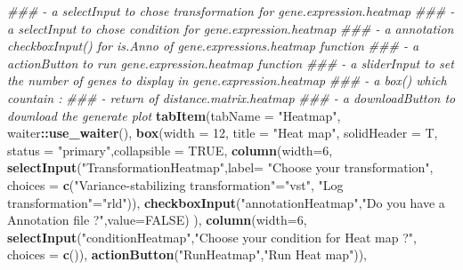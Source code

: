 \documentclass[
  12pt,
]{article}
\newenvironment{Shaded}{\begin{snugshade}}{\end{snugshade}}
\newcommand{\CommentTok}[1]{\textcolor[rgb]{0.56,0.35,0.01}{\textit{#1}}}
\newcommand{\DataTypeTok}[1]{\textcolor[rgb]{0.13,0.29,0.53}{#1}}
\newcommand{\DecValTok}[1]{\textcolor[rgb]{0.00,0.00,0.81}{#1}}
\newcommand{\KeywordTok}[1]{\textcolor[rgb]{0.13,0.29,0.53}{\textbf{#1}}}
\newcommand{\NormalTok}[1]{#1}
\newcommand{\OperatorTok}[1]{\textcolor[rgb]{0.81,0.36,0.00}{\textbf{#1}}}
\newcommand{\OtherTok}[1]{\textcolor[rgb]{0.56,0.35,0.01}{#1}}
\newcommand{\StringTok}[1]{\textcolor[rgb]{0.31,0.60,0.02}{#1}}
\begin{document}
\begin{Shaded}
\begin{Highlighting}[]
            \CommentTok{###         - a selectInput to chose transformation for gene.expression.heatmap  }
            \CommentTok{###         - a selectInput to chose condition for gene.expression.heatmap}
            \CommentTok{###         - a annotation checkboxInput() for is.Anno of gene.expressions.heatmap function}
            \CommentTok{###         - a actionButton to run gene.expression.heatmap function}
            \CommentTok{###         - a sliderInput to set the number of genes to display in gene.expression.heatmap}
            \CommentTok{###     - a box() which countain :}
            \CommentTok{###         - return of distance.matrix.heatmap}
            \CommentTok{###     - a downloadButton to download  the generate plot}
            \KeywordTok{tabItem}\NormalTok{(}\DataTypeTok{tabName =} \StringTok{"Heatmap"}\NormalTok{,}
\NormalTok{                    waiter}\OperatorTok{::}\KeywordTok{use_waiter}\NormalTok{(),}
                    \KeywordTok{box}\NormalTok{(}\DataTypeTok{width =} \DecValTok{12}\NormalTok{,}
                        \DataTypeTok{title =} \StringTok{"Heat map"}\NormalTok{, }\DataTypeTok{solidHeader =}\NormalTok{ T, }\DataTypeTok{status =} \StringTok{"primary"}\NormalTok{,}\DataTypeTok{collapsible =} \OtherTok{TRUE}\NormalTok{,}
                        \KeywordTok{column}\NormalTok{(}\DataTypeTok{width=}\DecValTok{6}\NormalTok{, }\KeywordTok{selectInput}\NormalTok{(}\StringTok{"TransformationHeatmap"}\NormalTok{,}\DataTypeTok{label=} \StringTok{"Choose your transformation"}\NormalTok{,}
                                                    \DataTypeTok{choices =} \KeywordTok{c}\NormalTok{(}\StringTok{"Variance-stabilizing transformation"}\NormalTok{=}\StringTok{"vst"}\NormalTok{,}
                                                                \StringTok{"Log transformation"}\NormalTok{=}\StringTok{"rld"}\NormalTok{)),}
                               \KeywordTok{checkboxInput}\NormalTok{(}\StringTok{"annotationHeatmap"}\NormalTok{,}\StringTok{"Do you have a Annotation file ?"}\NormalTok{,}\DataTypeTok{value=}\OtherTok{FALSE}\NormalTok{)}
\NormalTok{                        ),}
                        \KeywordTok{column}\NormalTok{(}\DataTypeTok{width=}\DecValTok{6}\NormalTok{,}
                               \KeywordTok{selectInput}\NormalTok{(}\StringTok{"conditionHeatmap"}\NormalTok{,}\StringTok{"Choose your condition for Heat map ?"}\NormalTok{, }
                                           \DataTypeTok{choices =} \KeywordTok{c}\NormalTok{()),}
                               \KeywordTok{actionButton}\NormalTok{(}\StringTok{"RunHeatmap"}\NormalTok{,}\StringTok{"Run Heat map"}\NormalTok{)),}

\end{Highlighting}
\end{Shaded}
\end{document}
